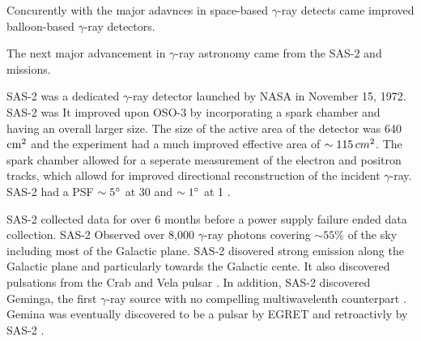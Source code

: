 Concurently with the major adavnces in space-based $\gamma$-ray detects
came improved balloon-based $\gamma$-ray detectors.




The next major advancement in $\gamma$-ray astronomy came from
the \ac{SAS-2} and \cosb missions.

\ac{SAS-2} was a dedicated $\gamma$-ray detector
launched by \ac{NASA} in November 15, 1972.  \ac{SAS-2} was
\cite{fichtel_1975_high-energy-gamma-ray} It improved upon \ac{OSO-3}
by incorporating a spark chamber and having an overall larger size.
The size of the active area of the detector was 640 $\text{cm}^2$ and the
experiment had a much improved effective area of $\sim 115\, cm^2$. The
spark chamber allowed for a seperate measurement of the electron and
positron tracks, which allowd for improved directional reconstruction
of the incident $\gamma$-ray. \ac{SAS-2} had a PSF $\sim5^\circ$ at 30
\mev and $\sim1^\circ$ at 1 \gev.

\ac{SAS-2} collected data for over 6 months before a power supply
failure ended data collection. \ac{SAS-2} Observed over 8,000
$\gamma$-ray photons covering $\sim55\%$ of
the sky including most of the Galactic plane.  
\ac{SAS-2} disovered strong emission
along the Galactic plane and particularly towards the Galactic
cente. It also discovered
pulsations from the
Crab \citep{fichtel_1975_high-energy-gamma-ray} and Vela pulsar
\citep{thompson_1977_sas-2-high-energy}.  In addition, \ac{SAS-2}
discovered Geminga, the first $\gamma$-ray source with no compelling
multiwavelenth counterpart \citep{thompson_1977_final-sas-2}. Gemina
was eventually discovered to be a pulsar by \ac{EGRET}
\citep{bertsch_1992_pulsed-high-energy} and retroactivly by \ac{SAS-2}
\citep{mattox_1992_observation-pulsed}.



